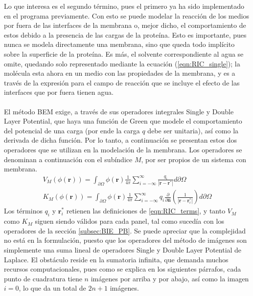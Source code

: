 \documentclass[12pt, twoside, onehalfspace, numbers, spanish]{ezthesis}
\numberwithin{equation}{section}
\begin{document}
Lo que interesa es el segundo término, pues el primero ya ha sido implementado en el programa previamente. Con esto se puede modelar la reacción de los medios por fuera de las interfaces de la membrana o, mejor dicho, el comportamiento de estos debido a la presencia de las cargas de la proteína. Esto es importante, pues nunca se modela directamente una membrana, sino que queda todo implícito sobre la superficie de la proteína. Es más, el solvente correspondiente al agua se omite, quedando solo representado mediante la ecuación (\ref{eqn:RIC_single}); la molécula esta ahora en un medio con las propiedades de la membrana, y es a través de la expresión para el campo de reacción que se incluye el efecto de las interfaces que por fuera tienen agua.\\\\
El método BEM exige, a través de sus operadores integrales Single y Double Layer Potential, que haya una función de Green que modele el comportamiento del potencial de una carga (por ende la carga $q$ debe ser unitaria), así como la derivada de dicha función. Por lo tanto, a continuación se presentan estos dos operadores que se utilizan en la modelación de la membrana. Los operadores se denominan a continuación con el subíndice $M$, por ser propios de un sistema con membrana.
\begin{align}
V_M(\phi(\mathbf{r})) = \int_{\partial\Omega}\phi(\mathbf{r})\frac{1}{4\pi}\sum_{i=-\infty}^{\infty}\frac{q_i}{|\mathbf{r} - \mathbf{r}^*|}d\partial\Omega \label{eqn:SLOp_Memb}\\
K_M(\phi(\mathbf{r})) = \int_{\partial\Omega}\phi(\mathbf{r})\frac{1}{4\pi}\sum_{i=-\infty}^{\infty}q_i\frac{\partial}{\partial\hat{\mathbf{n}}}\left(\frac{1}{|\mathbf{r} - \mathbf{r}_i^*|}\right)d\partial\Omega \label{eqn:DLOp_Memb}
\end{align}
Los términos $q_i$ y $\mathbf{r}_i^*$ retienen las definiciones de \ref{eqn:RIC_terms}, y tanto $V_M$ como $K_M$ siguen siendo válidos para cada panel, tal como sucedía con los operadores de la sección \ref{subsec:BIE_PB}. Se puede apreciar que la complejidad no está en la formulación, puesto que los operadores del método de imágenes son simplemente una suma lineal de operadores Single y Double Layer Potential de Laplace. El obstáculo reside en la sumatoria infinita, que demanda muchos recursos computacionales, pues como se explica en los siguientes párrafos, cada punto de cuadratura tiene $n$ imágenes por arriba y por abajo, así como la imagen $i=0$, lo que da un total de $2n + 1$ imágenes.
\end{document}
